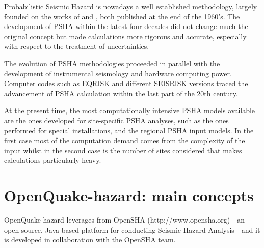Probabilistic Seismic Hazard is nowadays a well established methodology, largely founded on the works of \citeauthor{cornell1968} and \citeauthor{esteva1968}, both published at the end of the 1960's. 
%
The development of PSHA within the latest four decades did not change much the original concept but made calculations more rigorous and accurate, especially with respect to the treatment of uncertainties. 

The evolution of PSHA methodologies proceeded in parallel with the development of instrumental seismology and hardware computing power. Computer codes such as EQRISK \citep{mcguire1976} and different SEISRISK versions \citep{bender1982,bender1987} traced the advancement of PSHA calculation within
the last part of the 20th century.

At the present time, the most computationally intensive PSHA models available are the ones developed for site-specific PSHA analyses, such as the ones performed for special installations, and the regional PSHA input models. In the first case most of the computation demand comes from the complexity of the input whilst in the second case is the number of sites considered that makes calculations particularly heavy.  
%
\section{OpenQuake-hazard: main concepts}
OpenQuake-hazard leverages from OpenSHA (http://www.opensha.org) - an open-source, Java-based platform for conducting Seismic Hazard Analysis - and it is developed in collaboration with the OpenSHA team. 

